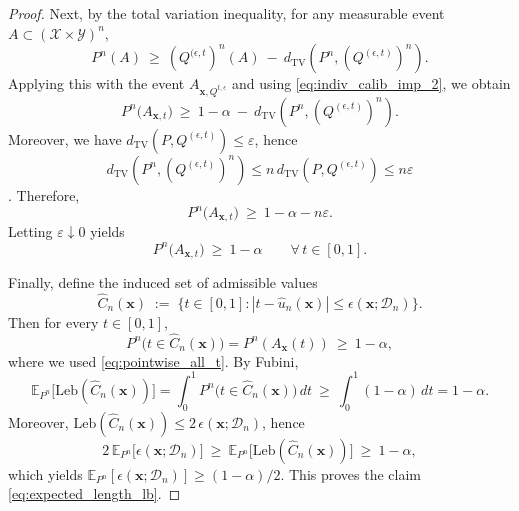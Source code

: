 \documentclass{article}
\theoremstyle{plain}
\theoremstyle{definition}
\theoremstyle{remark}
\begin{document}
\begin{proof}



Next, by the total variation inequality, for any measurable event $A \subset (\mathcal{X} \times \mathcal{Y})^n$,
\[
{P^n}(A)\ \ge\ {(Q^{(\epsilon,t})^n}(A)\ -\ d_{\mathrm{TV}}(P^n,(Q^{(\epsilon, t)})^n).
\]
Applying this with the event $A_{\mathbf{x},Q^{t, \epsilon}}$ and using \eqref{eq:indiv_calib_imp_2}, we obtain
\[
P^n\!\big(A_{\mathbf{x},t}\big)
\ \ge\
1-\alpha\ -\ d_{\mathrm{TV}}(P^n,(Q^{(\epsilon, t)})^n).
\]
Moreover, 
we have $d_{\mathrm{TV}}(P,Q^{(\epsilon,t)})\le \varepsilon$, hence
$$d_{\mathrm{TV}}(P^n,(Q^{(\epsilon, t)})^n)\le n\,d_{\mathrm{TV}}(P,Q^{(\epsilon,t)})\le n\varepsilon$$.
Therefore,
\[
P^n\!\big(A_{\mathbf{x},t}\big)\ \ge\ 1-\alpha-n\varepsilon.
\]
Letting $\varepsilon\downarrow 0$ yields
\begin{equation}
\label{eq:pointwise_all_t}
P^n\!\big(A_{\mathbf{x},t}\big)\ \ge\ 1-\alpha
\qquad \forall\,t\in[0,1].
\end{equation}

Finally, define the induced set of admissible values
\[
\widehat C_n(\mathbf{x})
\;:=\;
\big\{t\in[0,1]: |t-\widehat u_n(\mathbf{x})|\le \epsilon(\mathbf{x};\mathcal D_n)\big\}.
\]
Then for every $t\in[0,1]$,
\[
P^n\!\big(t\in \widehat C_n(\mathbf{x})\big)
=
P^n(A_{\mathbf{x}}(t))
\ \ge\ 1-\alpha,
\]
where we used \eqref{eq:pointwise_all_t}. By Fubini,
\[
\mathbb E_{P^n}\!\big[\mathrm{Leb}(\widehat C_n(\mathbf{x}))\big]
=
\int_0^1 P^n\!\big(t\in \widehat C_n(\mathbf{x})\big)\,dt
\ \ge\
\int_0^1 (1-\alpha)\,dt
=1-\alpha.
\]
Moreover, $\mathrm{Leb}(\widehat C_n(\mathbf{x}))\le 2\,\epsilon(\mathbf{x};\mathcal D_n)$, hence
\[
2\,\mathbb E_{P^n}\!\big[\epsilon(\mathbf{x};\mathcal D_n)\big]
\ \ge\
\mathbb E_{P^n}\!\big[\mathrm{Leb}(\widehat C_n(\mathbf{x}))\big]
\ \ge\ 1-\alpha,
\]
which yields $\mathbb E_{P^n}[\epsilon(\mathbf{x};\mathcal D_n)]\ge (1-\alpha)/2$. This proves the claim \eqref{eq:expected_length_lb}.
\end{proof}


\end{document}
